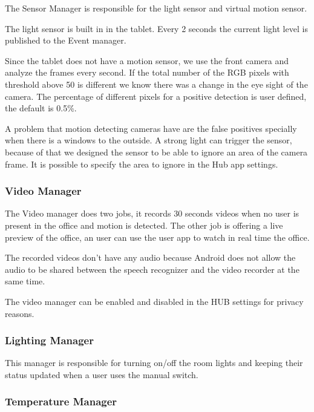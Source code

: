 The Sensor Manager is responsible for the light sensor and virtual motion sensor.

The light sensor is built in in the tablet. Every 2 seconds the current light level is published to the Event manager. 

Since the tablet does not have a motion sensor, we use the front camera and analyze the frames every second. If the total number of the RGB pixels with threshold above 50 is different we know there was a change in the eye sight of the camera. The percentage of different pixels for a positive detection is user defined, the default is 0.5\%.

A problem that motion detecting cameras have are the false positives specially when there is a windows to the outside. A strong light can trigger the sensor, because of that we designed the sensor to be able to ignore an area of the camera frame. It is possible to specify the area to ignore in the Hub app settings.


\subsubsection{Video Manager}

The Video manager does two jobs, it records 30 seconds videos when no user is present in the office and motion is detected. The other job is offering a live preview of the office, an user can use the user app to watch in real time the office.

The recorded videos don't have any audio because Android does not allow the audio to be shared between the speech recognizer and the video recorder at the same time.

The video manager can be enabled and disabled in the HUB settings for privacy reasons.



\subsubsection{Lighting Manager}

This manager is responsible for turning on/off the room lights and keeping their status updated when a user uses the manual switch. 






\subsubsection{Temperature Manager}\label{temperature_manager_imp}


